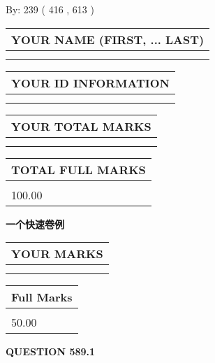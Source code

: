\documentclass{ctexart}
\begin{document}
   
\hspace{1.0in} By: 
 239 ( 416 ,  613 )
   
   
   
   
\newpage 
\setcounter{page}{ 
   589001 } 
   
   
   
   
\noindent\begin{tabular}{|l|}
\hline
YOUR NAME (FIRST, ... LAST)  \\
\hline
 \\ 
 \\ 
\hline
\end{tabular}
\hspace{0.05in} \begin{tabular}{|l|}
\hline
 YOUR   ID   INFORMATION  \\
\hline
 \\ 
 \\ 
\hline
\end{tabular}
   
   
\vspace{0.2in}\noindent\begin{tabular}{|l|}
\hline
YOUR TOTAL MARKS  \\
\hline
 \\ 
 \\ 
\hline
\end{tabular}
\hspace{0.05in} \begin{tabular}{|l|}
\hline
TOTAL FULL MARKS  \\
\hline
 \\ 
100.00 \\
\hline
\end{tabular}
   
   
 \vspace{0.2in}
{\LARGE {\textbf{ 一个快速卷例}}}
   
   
  
\vspace{0.2in}
  
\noindent\begin{tabular}{|l|}
\hline
 YOUR MARKS  \\
\hline
 \\ 
 \\ 
\hline
\end{tabular}
\hspace{0.05in} \begin{tabular}{|l|}
\hline
 Full Marks  \\
\hline
 \\ 
50.00 \\
\hline
\end{tabular}
{\textbf{\Large{QUESTION
589.1 
}}}
  
\end{document}
